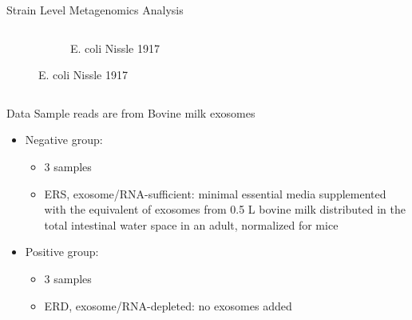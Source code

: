 \documentclass{beamer}
\begin{document}
\begin{frame}{Strain Level Metagenomics Analysis}
\begin{columns}
\begin{column}[t]{.52\textwidth}
\begin{figure}
\begin{subfigure}[t]{.48\textwidth}
					\caption{E. coli Nissle 1917}\label{fig:good-bacteria}
				\end{subfigure}
			\end{figure}
		\end{column}
	\end{columns}
\end{frame}
\begin{frame}{Data}
	Sample reads are from Bovine milk exosomes
	\begin{itemize}
		\item Negative group:
		      \begin{itemize}
			      \item 3 samples
			      \item ERS, exosome/RNA-sufficient: minimal essential media supplemented with the equivalent of exosomes from 0.5 L bovine milk distributed in the total intestinal water space in an adult, normalized for mice
		      \end{itemize}
		\item Positive group:
		      \begin{itemize}
			      \item 3 samples
			      \item ERD, exosome/RNA-depleted: no exosomes added
		      \end{itemize}
	\end{itemize}
\end{frame}
\end{document}
